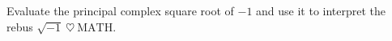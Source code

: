 Evaluate the principal complex square root of $-1 $ and use it to interpret the rebus $\sqrt{-1}\ \heartsuit\ \text{MATH}$.
